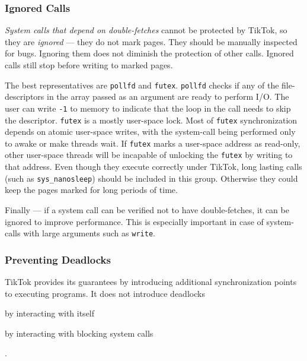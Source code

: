 \documentclass[conference]{IEEEtran}
\newcommand{\sysname}{TikTok}
\begin{document}
\subsubsection{Ignored Calls}

\emph{System calls that depend on double-fetches} cannot be protected by
\sysname{}, so they are \emph{ignored} --- they do not mark pages. They should
be manually inspected for bugs. Ignoring them does not diminish the protection
of other calls. Ignored calls still stop before writing to marked pages.

The best representatives are \texttt{pollfd} and \texttt{futex}. \texttt{pollfd}
checks if any of the file-descriptors in the array passed as an argument are
ready to perform I/O. The user can write \texttt{-1} to memory to indicate that
the loop in the call needs to skip the descriptor. \texttt{futex} is a mostly
user-space lock. Most of \texttt{futex} synchronization depends on atomic
user-space writes, with the system-call being performed only to awake or make
threads wait. If \texttt{futex} marks a user-space address as read-only, other
user-space threads will be incapable of unlocking the \texttt{futex} by writing
to that address. Even though they execute correctly under \sysname{}, long
lasting calls (such as \texttt{sys\_nanosleep}) should be included in this
group. Otherwise they could keep the pages marked for long periods of time.

Finally --- if a system call can be verified not to have double-fetches, it can
be ignored to improve performance. This is especially important in case of
system-calls with large arguments such as \texttt{write}.

\subsubsection{Preventing Deadlocks}
\label{subsubsec:deadlocks}

\sysname{} provides its guarantees by introducing additional synchronization
points to executing programs. It does not introduce deadlocks
\begin{enumerate*}\item by interacting with itself \item by interacting with
blocking system calls\end{enumerate*}.
\end{document}

